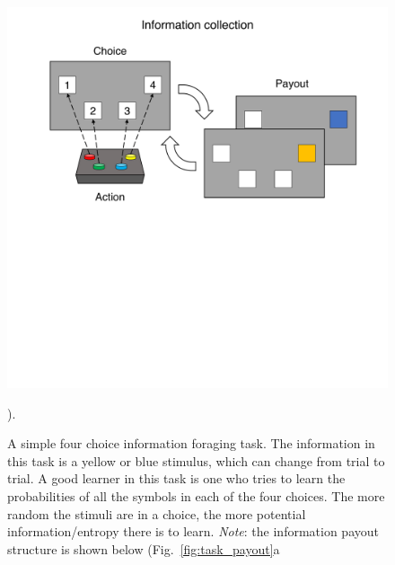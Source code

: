 \begin{figure}

	\includegraphics[width=0.7\linewidth]{img/task_outline1.pdf} 
	\caption{A simple four choice information foraging task. The information in this task is a yellow or blue stimulus, which can change from trial to trial. A good learner in this task is one who tries to learn the probabilities of all the symbols in each of the four choices. The more random the stimuli are in a choice, the more potential information/entropy there is to learn. \textit{Note}: the information payout structure is shown below (Fig.~\ref{fig:task_payout}a}).
	\label{fig:task_outline1} 
\end{figure}

